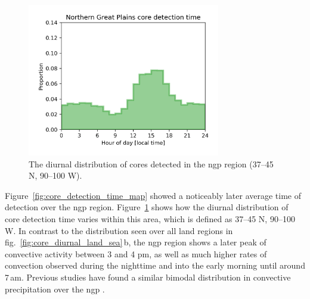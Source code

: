 \begin{figure}[tp]
    \centering
    \includegraphics[width=0.75\textwidth]{figures/chapter2_13.png}
    \caption[
    The diurnal distribution of cores detected in the \acrshort{ngp} region
    ]{
    The diurnal distribution of cores detected in the \acrshort{ngp} region (37--45\,\textdegree\,N, 90--100\,\textdegree\,W).
    }
    \label{fig:core_ngp_contrast}
\end{figure}

Figure~\ref{fig:core_detection_time_map} showed a noticeably later average time of detection over the \acrfull{ngp} region.
Figure~\ref{fig:core_ngp_contrast} shows how the diurnal distribution of core detection time varies within this area, which is defined as 37--45\,\textdegree\,N, 90--100\,\textdegree\,W.
In contrast to the distribution seen over all land regions in fig.~\ref{fig:core_diurnal_land_sea}\,b, the \acrshort{ngp} region shows a later peak of convective activity between 3 and 4 pm, as well as much higher rates of convection observed during the nighttime and into the early morning until around 7\,am.
Previous studies have found a similar bimodal distribution in convective precipitation over the \acrshort{ngp} \citet{li_high-resolution_2021}.

